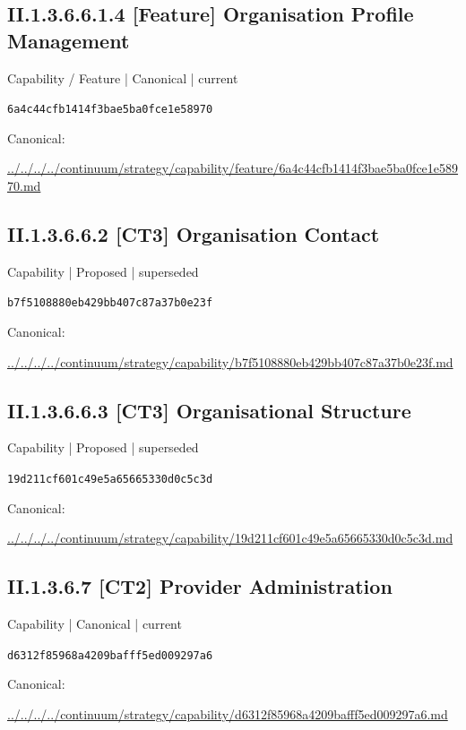 \documentclass[10pt,a4paper]{article}
\begin{document}
\subsection*{II.1.3.6.6.1.4 [Feature] Organisation Profile Management}
{\small Capability / Feature | Canonical | current}\par
\texttt{6a4c44cfb1414f3bae5ba0fce1e58970}\par
Canonical: \par
{\footnotesize\url{../../../../continuum/strategy/capability/feature/6a4c44cfb1414f3bae5ba0fce1e58970.md}}\par
\subsection*{II.1.3.6.6.2 [CT3] Organisation Contact}
{\small Capability | Proposed | superseded}\par
\texttt{b7f5108880eb429bb407c87a37b0e23f}\par
Canonical: \par
{\footnotesize\url{../../../../continuum/strategy/capability/b7f5108880eb429bb407c87a37b0e23f.md}}\par
\subsection*{II.1.3.6.6.3 [CT3] Organisational Structure}
{\small Capability | Proposed | superseded}\par
\texttt{19d211cf601c49e5a65665330d0c5c3d}\par
Canonical: \par
{\footnotesize\url{../../../../continuum/strategy/capability/19d211cf601c49e5a65665330d0c5c3d.md}}\par
\subsection*{II.1.3.6.7 [CT2] Provider Administration}
{\small Capability | Canonical | current}\par
\texttt{d6312f85968a4209bafff5ed009297a6}\par
Canonical: \par
{\footnotesize\url{../../../../continuum/strategy/capability/d6312f85968a4209bafff5ed009297a6.md}}\par
\end{document}
